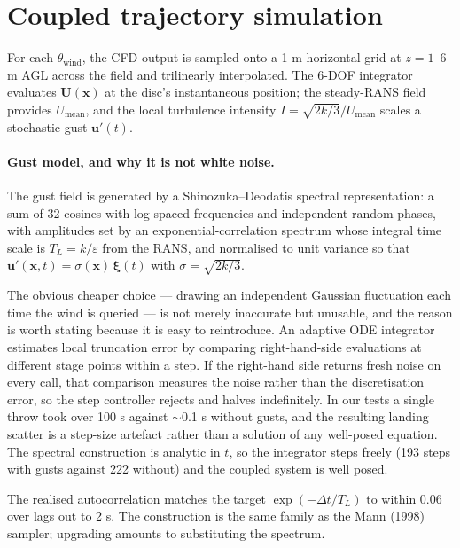 \documentclass[11pt,letterpaper]{article}
\begin{document}
\section{Coupled trajectory simulation}

For each $\theta_{\text{wind}}$, the CFD output is sampled onto a 1 m horizontal
grid at $z = 1$--6 m AGL across the field and trilinearly interpolated. The
6-DOF integrator evaluates $\mathbf{U}(\mathbf{x})$ at the disc's instantaneous
position; the steady-RANS field provides $U_{\text{mean}}$, and the local
turbulence intensity $I = \sqrt{2k/3}/U_{\text{mean}}$ scales a stochastic gust
$\mathbf{u}'(t)$.

\paragraph{Gust model, and why it is not white noise.} The gust field is
generated by a Shinozuka--Deodatis spectral representation: a sum of 32 cosines
with log-spaced frequencies and independent random phases, with amplitudes set
by an exponential-correlation spectrum whose integral time scale is
$T_L = k/\varepsilon$ from the RANS, and normalised to unit variance so that
$\mathbf{u}'(\mathbf{x},t) = \sigma(\mathbf{x})\,\bm{\xi}(t)$ with
$\sigma = \sqrt{2k/3}$.

The obvious cheaper choice --- drawing an independent Gaussian fluctuation each
time the wind is queried --- is not merely inaccurate but unusable, and the
reason is worth stating because it is easy to reintroduce. An adaptive ODE
integrator estimates local truncation error by comparing right-hand-side
evaluations at different stage points within a step. If the right-hand side
returns fresh noise on every call, that comparison measures the noise rather
than the discretisation error, so the step controller rejects and halves
indefinitely. In our tests a single throw took over 100 s against $\sim$0.1 s
without gusts, and the resulting landing scatter is a step-size artefact rather
than a solution of any well-posed equation. The spectral construction is
analytic in $t$, so the integrator steps freely (193 steps with gusts against
222 without) and the coupled system is well posed.

The realised autocorrelation matches the target $\exp(-\Delta t/T_L)$ to within
0.06 over lags out to 2 s. The construction is the same family as the Mann
(1998) sampler; upgrading amounts to substituting the spectrum.
\end{document}
